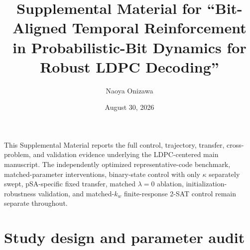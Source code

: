 \documentclass[aps,prapplied,preprint,superscriptaddress,longbibliography,floatfix]{revtex4-2}
\begin{document}
\title{Supplemental Material for ``Bit-Aligned Temporal Reinforcement in Probabilistic-Bit Dynamics for Robust LDPC Decoding''}
\author{Naoya Onizawa}
\date{August 30, 2026}
\maketitle

This Supplemental Material reports the full control, trajectory, transfer, cross-problem, and validation evidence underlying the LDPC-centered main manuscript.  The independently optimized representative-code benchmark, matched-parameter interventions, binary-state control with only $\kappa$ separately swept, pSA-specific fixed transfer, matched $\lambda=0$ ablation, initialization-robustness validation, and matched-$k_w$ finite-response 2-SAT control remain separate throughout.

\section{Study design and parameter audit}
\end{document}
